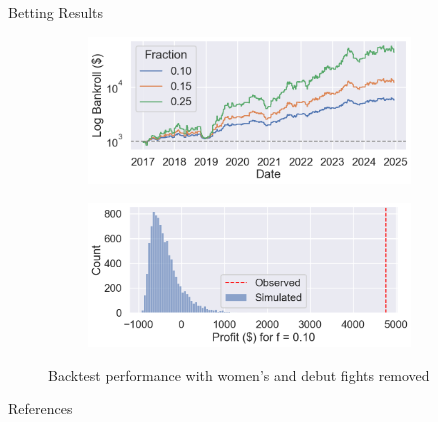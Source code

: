 \documentclass[final]{beamer}
\newlength{\sepwidth}
\newlength{\colwidth}
\newcommand{\separatorcolumn}{\begin{column}{\sepwidth}\end{column}}
\begin{document}
\begin{frame}[t]
\begin{columns}[t]
\begin{column}{\colwidth}
\begin{block}{Betting Results}
    \begin{figure}
        \centering
        \captionsetup{justification=centering}
        \begin{subfigure}{.49\linewidth}
            \centering
            \includegraphics[width=\linewidth]{figures/lr_case_study_bankroll.png}
        \end{subfigure}
        \begin{subfigure}{.49\linewidth}
            \centering
            \includegraphics[width=\linewidth]{figures/lr_case_study_0.1_null_dist.png}
        \end{subfigure}
        \caption{Backtest performance with women's and debut fights removed}
    \end{figure}

  \end{block}
    \vspace{-20pt}
  \begin{block}{References}

    \nocite{*}
    \scriptsize{}

  \end{block}

\end{column}

\separatorcolumn
\end{columns}
\end{frame}
\end{document}
